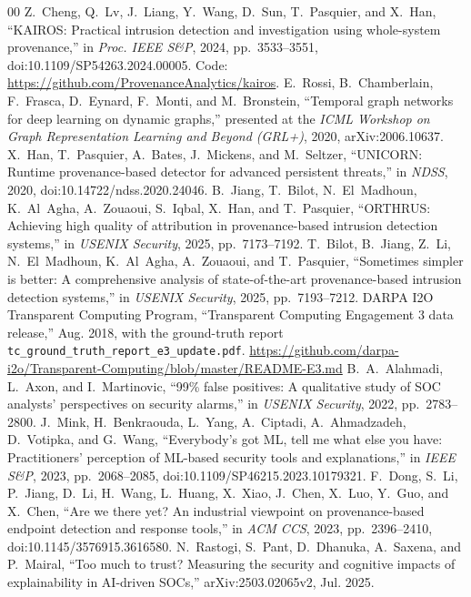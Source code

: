 \documentclass[conference]{IEEEtran}
\begin{document}
\begin{thebibliography}{00}
 Z.~Cheng, Q.~Lv, J.~Liang, Y.~Wang, D.~Sun, T.~Pasquier, and X.~Han, ``KAIROS: Practical intrusion detection and investigation using whole-system provenance,'' in \emph{Proc. IEEE S\&P}, 2024, pp.~3533--3551, doi:10.1109/SP54263.2024.00005. Code: \url{https://github.com/ProvenanceAnalytics/kairos}.
 E.~Rossi, B.~Chamberlain, F.~Frasca, D.~Eynard, F.~Monti, and M.~Bronstein, ``Temporal graph networks for deep learning on dynamic graphs,'' presented at the \emph{ICML Workshop on Graph Representation Learning and Beyond (GRL+)}, 2020, arXiv:2006.10637.
 X.~Han, T.~Pasquier, A.~Bates, J.~Mickens, and M.~Seltzer, ``UNICORN: Runtime provenance-based detector for advanced persistent threats,'' in \emph{NDSS}, 2020, doi:10.14722/ndss.2020.24046.
 B.~Jiang, T.~Bilot, N.~El~Madhoun, K.~Al~Agha, A.~Zouaoui, S.~Iqbal, X.~Han, and T.~Pasquier, ``ORTHRUS: Achieving high quality of attribution in provenance-based intrusion detection systems,'' in \emph{USENIX Security}, 2025, pp.~7173--7192.
 T.~Bilot, B.~Jiang, Z.~Li, N.~El~Madhoun, K.~Al~Agha, A.~Zouaoui, and T.~Pasquier, ``Sometimes simpler is better: A comprehensive analysis of state-of-the-art provenance-based intrusion detection systems,'' in \emph{USENIX Security}, 2025, pp.~7193--7212.
 DARPA I2O Transparent Computing Program, ``Transparent Computing Engagement 3 data release,'' Aug. 2018, with the ground-truth report \texttt{tc\_ground\_truth\_report\_e3\_update.pdf}. \url{https://github.com/darpa-i2o/Transparent-Computing/blob/master/README-E3.md}
 B.~A.~Alahmadi, L.~Axon, and I.~Martinovic, ``99\% false positives: A qualitative study of SOC analysts' perspectives on security alarms,'' in \emph{USENIX Security}, 2022, pp.~2783--2800.
 J.~Mink, H.~Benkraouda, L.~Yang, A.~Ciptadi, A.~Ahmadzadeh, D.~Votipka, and G.~Wang, ``Everybody's got ML, tell me what else you have: Practitioners' perception of ML-based security tools and explanations,'' in \emph{IEEE S\&P}, 2023, pp.~2068--2085, doi:10.1109/SP46215.2023.10179321.
 F.~Dong, S.~Li, P.~Jiang, D.~Li, H.~Wang, L.~Huang, X.~Xiao, J.~Chen, X.~Luo, Y.~Guo, and X.~Chen, ``Are we there yet? An industrial viewpoint on provenance-based endpoint detection and response tools,'' in \emph{ACM CCS}, 2023, pp.~2396--2410, doi:10.1145/3576915.3616580.
 N.~Rastogi, S.~Pant, D.~Dhanuka, A.~Saxena, and P.~Mairal, ``Too much to trust? Measuring the security and cognitive impacts of explainability in AI-driven SOCs,'' arXiv:2503.02065v2, Jul. 2025.

\end{thebibliography}
\end{document}

